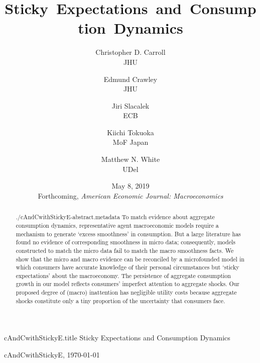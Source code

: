 
\begin{adjustwidth}{-1em}{-1em}

\begin{verbatimwrite}{cAndCwithStickyE.title}
Sticky Expectations and Consumption Dynamics
\end{verbatimwrite}

\hfill{\tiny cAndCwithStickyE, \today}

\title{Sticky~Expectations~and~Consumption~Dynamics}

{
\author{
  Christopher D. Carroll\authNum \\ {\small JHU}
  \and
  Edmund Crawley\authNum   \\ {\small JHU}
  \and
  Jiri Slacalek\authNum    \\ {\small ECB}
  \and
  Kiichi Tokuoka\authNum   \\ {\small MoF Japan}
  \and
  Matthew N. White\authNum \\ {\small UDel}
}
} %



\date{May 8, 2019 \\ \large{Forthcoming, \textit{American Economic Journal: Macroeconomics}}}
\maketitle

\hypertarget{Abstract}{} 
\begin{abstract}
  \begin{verbatimwrite}{./cAndCwithStickyE-abstract.metadata}
   To match evidence about aggregate consumption dynamics, representative agent macroeconomic models require a mechanism to generate `excess smoothness' in consumption.   But a large literature has found no evidence of corresponding smoothness in micro data; consequently, models constructed to match the micro data fail to match the macro smoothness facts.  We show that the micro and macro evidence can be reconciled by a microfounded model in which consumers have accurate knowledge of their personal circumstances but `sticky expectations' about the macroeconomy.  The persistence of aggregate consumption growth in our model reflects consumers' imperfect attention to aggregate shocks. Our proposed degree of (macro) inattention has negligible utility costs because aggregate shocks constitute only a tiny proportion of the uncertainty that consumers face.%
  \end{verbatimwrite}
  
\end{abstract}


\end{adjustwidth}
